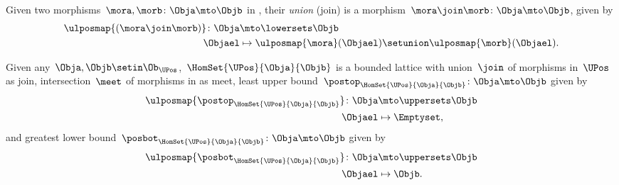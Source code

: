 \begin{definition}
    Given two morphisms~$\mora,\morb\colon \Obja \mto \Objb$ in \LPos, their \emph{union} (join) is a morphism~$\mora \join \morb \colon \Obja \mto \Objb$, given by
    \begin{equation}
        \begin{aligned}
            \ulposmap{(\mora \join \morb)}\colon \Obja & \mto \lowersets \Objb \\
            \Objael                                    & \mapsto \ulposmap{\mora}(\Objael) \setunion \ulposmap{\morb}(\Objael).
        \end{aligned}
    \end{equation}
\end{definition}

\begin{lemma}
    \label{lem:UPos-is-bounded-lattice}
    Given any~$\Obja,\Objb\setin \Ob_\UPos$,~$\HomSet{\UPos}{\Obja}{\Objb}$ is a bounded lattice with union~$\join$ of morphisms in~$\UPos$ as join, intersection~$\meet$ of morphisms in \UPos as meet, least upper bound~$\postop_{\HomSet{\UPos}{\Obja}{\Objb}}\colon \Obja \mto \Objb$ given by
    \begin{equation}
        \begin{aligned}
            \ulposmap{\postop_{\HomSet{\UPos}{\Obja}{\Objb}}}\colon \Obja & \mto \uppersets \Objb \\
            \Objael                                                       & \mapsto \Emptyset,
        \end{aligned}
    \end{equation}
    and greatest lower bound~$\posbot_{\HomSet{\UPos}{\Obja}{\Objb}}\colon \Obja \mto \Objb$ given by
    \begin{equation}
        \begin{aligned}
            \ulposmap{\posbot_{\HomSet{\UPos}{\Obja}{\Objb}}}\colon \Obja & \mto \uppersets \Objb \\
            \Objael                                                       & \mapsto \Objb.
        \end{aligned}
    \end{equation}
\end{lemma}
